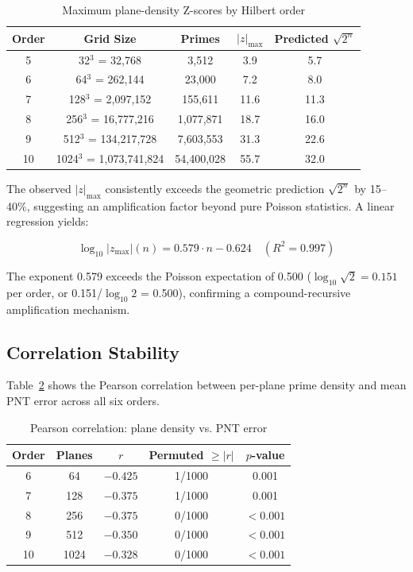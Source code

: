 \documentclass[11pt,a4paper]{article}
\begin{document}
\begin{table}[h]
\centering
\caption{Maximum plane-density Z-scores by Hilbert order}
\label{tab:density}
\begin{tabular}{ccccc}
\toprule
Order & Grid Size & Primes & $|z|_{\max}$ & Predicted $\sqrt{2^n}$ \\
\midrule
5  & 32$^3$ = 32,768         & 3,512      & 3.9   & 5.7  \\
6  & 64$^3$ = 262,144        & 23,000     & 7.2   & 8.0  \\
7  & 128$^3$ = 2,097,152     & 155,611    & 11.6  & 11.3 \\
8  & 256$^3$ = 16,777,216    & 1,077,871  & 18.7  & 16.0 \\
9  & 512$^3$ = 134,217,728   & 7,603,553  & 31.3  & 22.6 \\
10 & 1024$^3$ = 1,073,741,824 & 54,400,028 & 55.7  & 32.0 \\
\bottomrule
\end{tabular}
\end{table}

The observed $|z|_{\max}$ consistently exceeds the geometric prediction
$\sqrt{2^n}$ by 15--40\%, suggesting an amplification factor beyond
pure Poisson statistics. A linear regression yields:

\begin{equation}
\log_{10} |z_{\max}|(n) = 0.579 \cdot n - 0.624 \quad (R^2 = 0.997)
\end{equation}

The exponent 0.579 exceeds the Poisson expectation of 0.500 ($\log_{10}
\sqrt{2} = 0.151$ per order, or 0.151/$\log_{10}2$ = 0.500), confirming
a compound-recursive amplification mechanism.

\subsection{Correlation Stability}

Table~\ref{tab:correlation} shows the Pearson correlation between per-plane
prime density and mean PNT error across all six orders.

\begin{table}[h]
\centering
\caption{Pearson correlation: plane density vs. PNT error}
\label{tab:correlation}
\begin{tabular}{ccccc}
\toprule
Order & Planes & $r$ & Permuted $\geq |r|$ & $p$-value \\
\midrule
6  & 64   & $-0.425$ & 1/1000 & 0.001 \\
7  & 128  & $-0.375$ & 1/1000 & 0.001 \\
8  & 256  & $-0.375$ & 0/1000 & $<0.001$ \\
9  & 512  & $-0.350$ & 0/1000 & $<0.001$ \\
10 & 1024 & $-0.328$ & 0/1000 & $<0.001$ \\
\bottomrule
\end{tabular}
\end{table}
\end{document}
